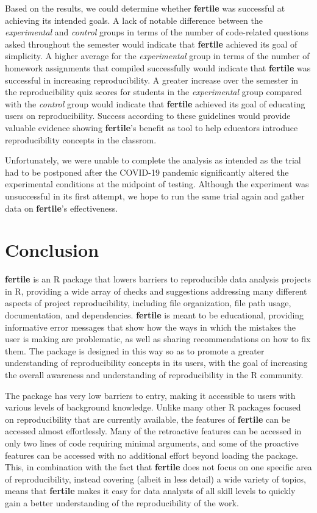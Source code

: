 \documentclass[APA,LATO1COL]{WileyNJD-v2}\usepackage[]{graphicx}\usepackage[]{color}
\newcommand{\R}{\textsf{R}\xspace}
\newcommand{\pkg}[1]{\textbf{#1}}
\begin{document}
Based on the results, we could determine whether \pkg{fertile} was successful at achieving its intended goals. A lack of notable difference between the \emph{experimental} and \emph{control} groups in terms of the number of code-related questions asked throughout the semester would indicate that \pkg{fertile} achieved its goal of simplicity. A higher average for the \emph{experimental} group in terms of the number of homework assignments that compiled successfully would indicate that \pkg{fertile} was successful in increasing reproducibility. A greater increase over the semester in the reproducibility quiz scores for students in the \emph{experimental} group compared with the \emph{control} group would indicate that \pkg{fertile} achieved its goal of educating users on reproducibility. Success according to these guidelines would provide valuable evidence showing \pkg{fertile}'s benefit as tool to help educators introduce reproducibility concepts in the classrom.

 Unfortunately, we were unable to complete the analysis as intended as the trial had to be postponed after the COVID-19 pandemic significantly altered the experimental conditions at the midpoint of testing. Although the experiment was unsuccessful in its first attempt, we hope to run the same trial again and gather data on \pkg{fertile}'s effectiveness. 



\section{Conclusion}\label{sec:conclusion}


\pkg{fertile} is an \R package that lowers barriers to reproducible data analysis projects in \R, providing a wide array of checks and suggestions addressing many different aspects of project reproducibility, including file organization, file path usage, documentation, and dependencies.
\pkg{fertile} is meant to be educational, providing informative error messages that show how the ways in which the mistakes the user is making are problematic, as well as sharing recommendations on how to fix them. The package is designed in this way so as to promote a greater understanding of reproducibility concepts in its users, with the goal of increasing the overall awareness and understanding of reproducibility in the \R community.

The package has very low barriers to entry, making it accessible to users with various levels of background knowledge. Unlike many other \R packages focused on reproducibility that are currently available, the features of \pkg{fertile} can be accessed almost effortlessly. Many of the retroactive features can be accessed in only two lines of code requiring minimal arguments, and some of the proactive features can be accessed with no additional effort beyond loading the package. This, in combination with the fact that \pkg{fertile} does not focus on one specific area of reproducibility, instead covering (albeit in less detail) a wide variety of topics, means that \pkg{fertile} makes it easy for data analysts of all skill levels to quickly gain a better understanding of the reproducibility of the work.
\end{document}
